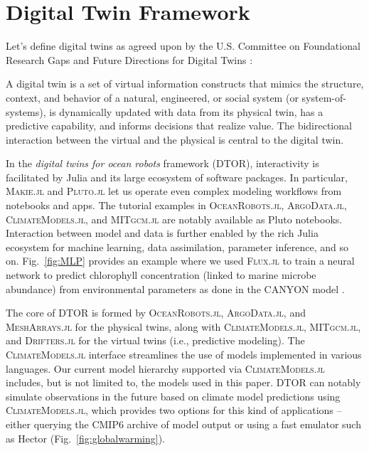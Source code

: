\documentclass{juliacon}[12pt]
\newcommand{\pkg}[1]{{\small \textsc{#1}}}
\begin{document}
\section{Digital Twin Framework} \label{sec:DT}

Let's define digital twins as agreed upon by the U.S. Committee on Foundational Research Gaps and Future Directions for Digital Twins \cite{DT2024} : 

\begin{defi}
A digital twin is a set of virtual information constructs that mimics the structure, context, and behavior of a natural, engineered, or social system (or system-of-systems), is dynamically updated with data from its physical twin, has a predictive capability, and informs decisions that realize value. The bidirectional interaction between the virtual and the physical is central to the digital twin.
\end{defi}

In the {\it digital twins for ocean robots} framework (DTOR), interactivity is facilitated by Julia and its large ecosystem of software packages. In particular, \pkg{Makie.jl} \cite{Makie} and \pkg{Pluto.jl} \cite{Pluto} let us operate even complex modeling workflows from notebooks and apps. The tutorial examples in \pkg{OceanRobots.jl}, \pkg{ArgoData.jl}, \pkg{ClimateModels.jl}, and \pkg{MITgcm.jl} \cite{Forget2024b} are notably available as Pluto notebooks. Interaction between model and data is further enabled by the rich Julia ecosystem for machine learning, data assimilation, parameter inference, and so on. Fig.~\ref{fig:MLP} provides an example where we used \pkg{Flux.jl} \cite{Innes2018} to train a neural network to predict chlorophyll concentration (linked to marine microbe abundance) from environmental parameters as done in the CANYON model \cite{Sauzede2017,Bittig2018}.

The core of DTOR is formed by \pkg{OceanRobots.jl}, \pkg{ArgoData.jl}, and \pkg{MeshArrays.jl} for the physical twins, along with \pkg{ClimateModels.jl}, \pkg{MITgcm.jl}, and \pkg{Drifters.jl} for the virtual twins (i.e., predictive modeling). The \pkg{ClimateModels.jl} interface streamlines the use of models implemented in various languages. Our current model hierarchy supported via \pkg{ClimateModels.jl} includes, but is not limited to, the models used in this paper. DTOR can notably simulate observations in the future based on climate model predictions using \pkg{ClimateModels.jl}, which provides two options for this kind of applications -- either querying the CMIP6 archive of model output \cite{CMIP6} or using a fast emulator such as Hector \cite{Hector2015} (Fig.~\ref{fig:globalwarming}). 
\end{document}
